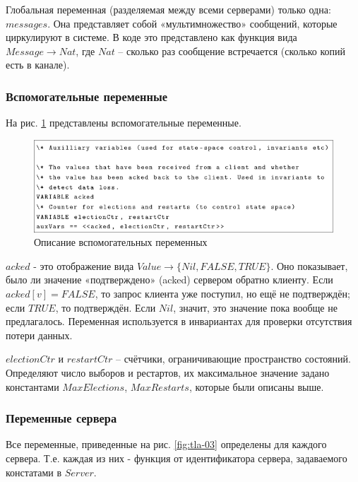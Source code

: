 Глобальная переменная (разделяемая между всеми серверами) только одна: $messages$.
Она представляет собой «мультимножество» сообщений, которые циркулируют в системе.
В коде это представлено как функция вида $Message \rightarrow Nat$, где $Nat$ –
сколько раз сообщение встречается (сколько копий есть в канале).

\subsubsection*{Вспомогательные переменные}

На рис. \ref{fig:tla-02} представлены вспомогательные переменные.

\begin{figure}
  \centering
  \includegraphics[scale=0.6]{inc/tla-02.png}
  \caption{Описание вспомогательных переменных}
  \label{fig:tla-02}
\end{figure}

$acked$ - это отображение вида $Value \rightarrow \{Nil, FALSE, TRUE\}$. Оно
показывает, было ли значение «подтверждено» (acked) сервером обратно клиенту.
Если $acked[v] = FALSE$, то запрос клиента уже поступил, но ещё не подтверждён;
если $TRUE$, то подтверждён. Если $Nil$, значит, это значение пока вообще не
предлагалось. Переменная используется в инвариантах для проверки отсутствия
потери данных.

$electionCtr$ и $restartCtr$ – счётчики, ограничивающие пространство состояний.
Определяют число выборов и рестартов, их максимальное значение задано константами
$MaxElections$, $MaxRestarts$, которые были описаны выше.

\subsubsection*{Переменные сервера}

Все переменные, приведенные на рис. \ref{fig:tla-03} определены для каждого
сервера. Т.е. каждая из них - функция от идентификатора сервера, задаваемого
констатами в $Server$.

